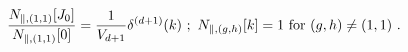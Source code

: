 \begin{equation}
  \frac{N_{\parallel,(1,1)}[J_0]}{N_{\parallel,(1,1)}[0]}
  =\frac{1}{V_{d+1}}\delta^{(d+1)}(k) \ ;
  \ N_{\parallel,(g,h)}[k] = 1\ {\rm for}\
  (g,h)\neq (1,1) \ .
\end{equation}

